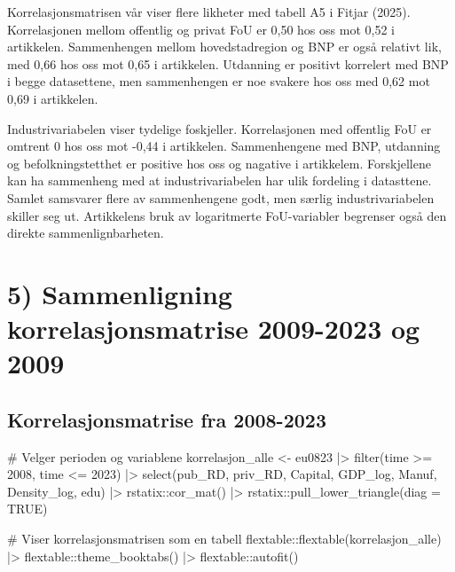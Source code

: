 \documentclass[
  letterpaper,
  DIV=11,
  numbers=noendperiod]{scrartcl}
\newenvironment{Shaded}{\begin{snugshade}}{\end{snugshade}}
\newcommand{\AttributeTok}[1]{\textcolor[rgb]{0.40,0.45,0.13}{#1}}
\newcommand{\CommentTok}[1]{\textcolor[rgb]{0.37,0.37,0.37}{#1}}
\newcommand{\ConstantTok}[1]{\textcolor[rgb]{0.56,0.35,0.01}{#1}}
\newcommand{\DecValTok}[1]{\textcolor[rgb]{0.68,0.00,0.00}{#1}}
\newcommand{\FunctionTok}[1]{\textcolor[rgb]{0.28,0.35,0.67}{#1}}
\newcommand{\NormalTok}[1]{\textcolor[rgb]{0.00,0.23,0.31}{#1}}
\newcommand{\OtherTok}[1]{\textcolor[rgb]{0.00,0.23,0.31}{#1}}
\newcommand{\SpecialCharTok}[1]{\textcolor[rgb]{0.37,0.37,0.37}{#1}}
\begin{document}
Korrelasjonsmatrisen vår viser flere likheter med tabell A5 i Fitjar
(2025). Korrelasjonen mellom offentlig og privat FoU er 0,50 hos oss mot
0,52 i artikkelen. Sammenhengen mellom hovedstadregion og BNP er også
relativt lik, med 0,66 hos oss mot 0,65 i artikkelen. Utdanning er
positivt korrelert med BNP i begge datasettene, men sammenhengen er noe
svakere hos oss med 0,62 mot 0,69 i artikkelen.

Industrivariabelen viser tydelige foskjeller. Korrelasjonen med
offentlig FoU er omtrent 0 hos oss mot -0,44 i artikkelen. Sammenhengene
med BNP, utdanning og befolkningstetthet er positive hos oss og nagative
i artikkelem. Forskjellene kan ha sammenheng med at industrivariabelen
har ulik fordeling i datasttene. Samlet samsvarer flere av sammenhengene
godt, men særlig industrivariabelen skiller seg ut. Artikkelens bruk av
logaritmerte FoU-variabler begrenser også den direkte
sammenlignbarheten.

\section{5) Sammenligning korrelasjonsmatrise 2009-2023 og
2009}\label{sammenligning-korrelasjonsmatrise-2009-2023-og-2009}

\subsection{Korrelasjonsmatrise fra
2008-2023}\label{korrelasjonsmatrise-fra-2008-2023}

\begin{Shaded}
\begin{Highlighting}[]
\CommentTok{\# Velger perioden og variablene}
\NormalTok{korrelasjon\_alle }\OtherTok{\textless{}{-}}\NormalTok{ eu0823 }\SpecialCharTok{|\textgreater{}}
  \FunctionTok{filter}\NormalTok{(time }\SpecialCharTok{\textgreater{}=} \DecValTok{2008}\NormalTok{, time }\SpecialCharTok{\textless{}=} \DecValTok{2023}\NormalTok{) }\SpecialCharTok{|\textgreater{}}
  \FunctionTok{select}\NormalTok{(pub\_RD, priv\_RD, Capital, GDP\_log,}
\NormalTok{         Manuf, Density\_log, edu) }\SpecialCharTok{|\textgreater{}}
\NormalTok{  rstatix}\SpecialCharTok{::}\FunctionTok{cor\_mat}\NormalTok{() }\SpecialCharTok{|\textgreater{}}
\NormalTok{  rstatix}\SpecialCharTok{::}\FunctionTok{pull\_lower\_triangle}\NormalTok{(}\AttributeTok{diag =} \ConstantTok{TRUE}\NormalTok{)}

\CommentTok{\# Viser korrelasjonsmatrisen som en tabell}
\NormalTok{flextable}\SpecialCharTok{::}\FunctionTok{flextable}\NormalTok{(korrelasjon\_alle) }\SpecialCharTok{|\textgreater{}}
\NormalTok{  flextable}\SpecialCharTok{::}\FunctionTok{theme\_booktabs}\NormalTok{() }\SpecialCharTok{|\textgreater{}}
\NormalTok{  flextable}\SpecialCharTok{::}\FunctionTok{autofit}\NormalTok{()}
\end{Highlighting}
\end{Shaded}
\end{document}
